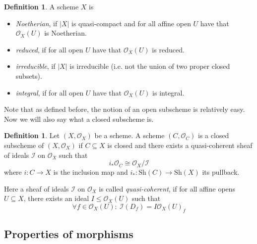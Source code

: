 \documentclass{scrartcl}
\renewcommand{\O}{\mathcal{O}}
\theoremstyle{definition}
\newtheorem{definition}[prop]{Definition}
\begin{document}
\begin{definition}
    A scheme $X$ is
    \begin{itemize}
        \item \emph{Noetherian}, if $|X|$ is quasi-compact and for all affine open $U$ have that $\O_X(U)$ is Noetherian.
        \item \emph{reduced}, if for all open $U$ have that $\O_X(U)$ is reduced.
        \item \emph{irreducible}, if $|X|$ is irreducible (i.e. not the union of two proper closed subsets).
        \item \emph{integral}, if for all open $U$ have that $\O_X(U)$ is integral.
    \end{itemize}
\end{definition}

Note that as defined before, the notion of an open subscheme is relatively easy.
Now we will also say what a closed subscheme is.

\begin{definition}
    Let $(X, \O_X)$ be a scheme.
    A scheme $(C, \O_C)$ is a closed subscheme of $(X, \O_X)$ if $C \subseteq X$ is closed and there exists a quasi-coherent sheaf of ideals $\mathcal{I}$ on $\O_X$ such that
    \begin{equation*}
        i_*\O_C \cong \O_X/\mathcal{I}
    \end{equation*}
    where $i: C \to X$ is the inclusion map and $i_*: \mathrm{Sh}(C) \to \mathrm{Sh}(X)$ its pullback.

    Here a sheaf of ideals $\mathcal{I}$ on $\O_X$ is called \emph{quasi-coherent}, if for all affine opens $U \subseteq X$, there exists an ideal $I \leq \O_X(U)$ such that
    \begin{equation*}
        \forall f \in \O_X(U): \ \mathcal{I}(D_f) = I \mathcal{O}_X(U)_f
    \end{equation*}
\end{definition}

\subsection{Properties of morphisms}
\end{document}
